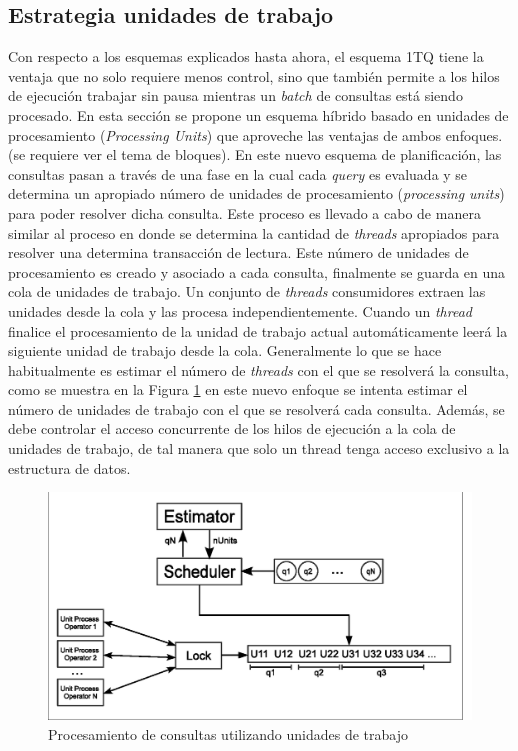 \subsection{Estrategia unidades de trabajo}
\label{scheduling:unidadestrabajo}
Con respecto a los esquemas explicados hasta ahora, el esquema 1TQ tiene la ventaja que no solo requiere menos control, sino que también permite a los hilos de ejecución trabajar sin pausa mientras un \textit{batch} de consultas está siendo procesado. En esta sección se propone un esquema híbrido basado en unidades de procesamiento (\textit{Processing Units}) que aproveche las ventajas de ambos enfoques. (se requiere ver el tema de bloques).
En este nuevo esquema de planificación, las consultas pasan a través de una fase en la cual cada \textit{query} es evaluada y se determina un apropiado número de unidades de procesamiento (\textit{processing units}) para poder resolver dicha consulta. Este proceso es llevado a cabo de manera similar al proceso en donde se determina la cantidad de \textit{threads} apropiados para resolver una determina transacción de lectura. Este número de unidades de procesamiento es creado y asociado a cada consulta, finalmente se guarda en una cola de unidades de trabajo. Un conjunto de \textit{threads} consumidores extraen las unidades desde la cola y las procesa independientemente. Cuando un \textit{thread} finalice el procesamiento de la unidad de trabajo actual automáticamente leerá la siguiente unidad de trabajo desde la cola. 
Generalmente lo que se hace habitualmente es estimar el número de \textit{threads} con el que se resolverá la consulta, como se muestra en la Figura \ref{fig:unit_process} en este nuevo enfoque se intenta estimar el número de unidades de trabajo con el que se resolverá cada consulta. Además, se debe controlar el acceso concurrente de los hilos de ejecución a la cola de unidades de trabajo, de tal manera que solo un thread tenga acceso exclusivo a la estructura de datos. 

\begin{figure}[!th]
\centering
\includegraphics[scale=.75]{images/unit_process.eps}
\caption{Procesamiento de consultas utilizando unidades de trabajo}
\label{fig:unit_process}
\end{figure}

